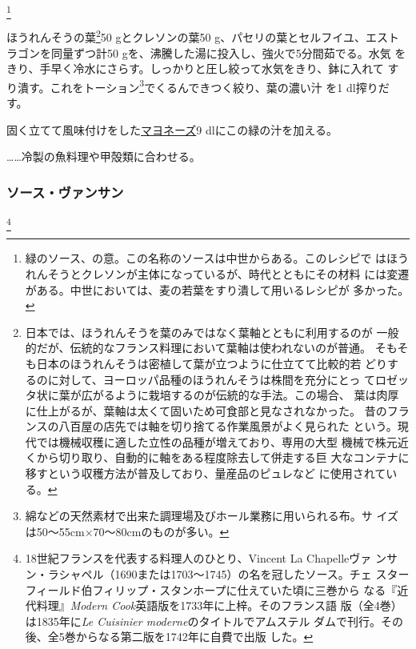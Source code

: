 \begin{recette}
\footnote{緑のソース、の意。この名称のソースは中世からある。このレシピで
  はほうれんそうとクレソンが主体になっているが、時代とともにその材料
  には変遷がある。中世においては、麦の若葉をすり潰して用いるレシピが
  多かった。}


ほうれんそうの葉\footnote{日本では、ほうれんそうを葉のみではなく葉軸とともに利用するのが
  一般的だが、伝統的なフランス料理において葉軸は使われないのが普通。
  そもそも日本のほうれんそうは密植して葉が立つように仕立てて比較的若
  どりするのに対して、ヨーロッパ品種のほうれんそうは株間を充分にとっ
  てロゼッタ状に葉が広がるように栽培するのが伝統的な手法。この場合、
  葉は肉厚に仕上がるが、葉軸は太くて固いため可食部と見なされなかった。
  昔のフランスの八百屋の店先では軸を切り捨てる作業風景がよく見られた
  という。現代では機械収穫に適した立性の品種が増えており、専用の大型
  機械で株元近くから切り取り、自動的に軸をある程度除去して併走する巨
  大なコンテナに移すという収穫方法が普及しており、量産品のピュレなど
  に使用されている。}50 gとクレソンの葉50
g、パセリの葉とセルフイユ、エスト ラゴンを同量ずつ計50
gを、沸騰した湯に投入し、強火で5分間茹でる。水気
をきり、手早く冷水にさらす。しっかりと圧し絞って水気をきり、鉢に入れて
すり潰す。これをトーション\footnote{綿などの天然素材で出来た調理場及びホール業務に用いられる布。サ
  イズは50〜55cm×70〜80cmのものが多い。}でくるんできつく絞り、葉の濃い汁
を1 dl搾りだす。

固く立てて風味付けをした\protect\hyperlink{mayonnaise}{マヨネーズ}9
dlにこの緑の汁を加える。

\ldots{}\ldots{}冷製の魚料理や甲殻類に合わせる。

\maeaki

\hypertarget{sauce-vincent}{%
\subsubsection{ソース・ヴァンサン}\label{sauce-vincent}}

\footnote{18世紀フランスを代表する料理人のひとり、Vincent
  La Chapelleヴァ
  ンサン・ラシャペル（1690または1703〜1745）の名を冠したソース。チェ
  スターフィールド伯フィリップ・スタンホープに仕えていた頃に三巻から
  なる『近代料理』\emph{Modern Cook}英語版を1733年に上梓。そのフランス語
  版（全4巻）は1835年に\emph{Le Cuisinier moderne}のタイトルでアムステル
  ダムで刊行。その後、全5巻からなる第二版を1742年に自費で出版 した。}


\end{recette}
